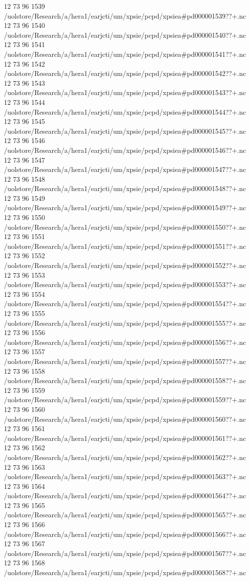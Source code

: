 12 73 96
1539
/uolstore/Research/a/hera1/earjcti/um/xpsie/pcpd/xpsiea#pd000001539??+.nc
12 73 96
1540
/uolstore/Research/a/hera1/earjcti/um/xpsie/pcpd/xpsiea#pd000001540??+.nc
12 73 96
1541
/uolstore/Research/a/hera1/earjcti/um/xpsie/pcpd/xpsiea#pd000001541??+.nc
12 73 96
1542
/uolstore/Research/a/hera1/earjcti/um/xpsie/pcpd/xpsiea#pd000001542??+.nc
12 73 96
1543
/uolstore/Research/a/hera1/earjcti/um/xpsie/pcpd/xpsiea#pd000001543??+.nc
12 73 96
1544
/uolstore/Research/a/hera1/earjcti/um/xpsie/pcpd/xpsiea#pd000001544??+.nc
12 73 96
1545
/uolstore/Research/a/hera1/earjcti/um/xpsie/pcpd/xpsiea#pd000001545??+.nc
12 73 96
1546
/uolstore/Research/a/hera1/earjcti/um/xpsie/pcpd/xpsiea#pd000001546??+.nc
12 73 96
1547
/uolstore/Research/a/hera1/earjcti/um/xpsie/pcpd/xpsiea#pd000001547??+.nc
12 73 96
1548
/uolstore/Research/a/hera1/earjcti/um/xpsie/pcpd/xpsiea#pd000001548??+.nc
12 73 96
1549
/uolstore/Research/a/hera1/earjcti/um/xpsie/pcpd/xpsiea#pd000001549??+.nc
12 73 96
1550
/uolstore/Research/a/hera1/earjcti/um/xpsie/pcpd/xpsiea#pd000001550??+.nc
12 73 96
1551
/uolstore/Research/a/hera1/earjcti/um/xpsie/pcpd/xpsiea#pd000001551??+.nc
12 73 96
1552
/uolstore/Research/a/hera1/earjcti/um/xpsie/pcpd/xpsiea#pd000001552??+.nc
12 73 96
1553
/uolstore/Research/a/hera1/earjcti/um/xpsie/pcpd/xpsiea#pd000001553??+.nc
12 73 96
1554
/uolstore/Research/a/hera1/earjcti/um/xpsie/pcpd/xpsiea#pd000001554??+.nc
12 73 96
1555
/uolstore/Research/a/hera1/earjcti/um/xpsie/pcpd/xpsiea#pd000001555??+.nc
12 73 96
1556
/uolstore/Research/a/hera1/earjcti/um/xpsie/pcpd/xpsiea#pd000001556??+.nc
12 73 96
1557
/uolstore/Research/a/hera1/earjcti/um/xpsie/pcpd/xpsiea#pd000001557??+.nc
12 73 96
1558
/uolstore/Research/a/hera1/earjcti/um/xpsie/pcpd/xpsiea#pd000001558??+.nc
12 73 96
1559
/uolstore/Research/a/hera1/earjcti/um/xpsie/pcpd/xpsiea#pd000001559??+.nc
12 73 96
1560
/uolstore/Research/a/hera1/earjcti/um/xpsie/pcpd/xpsiea#pd000001560??+.nc
12 73 96
1561
/uolstore/Research/a/hera1/earjcti/um/xpsie/pcpd/xpsiea#pd000001561??+.nc
12 73 96
1562
/uolstore/Research/a/hera1/earjcti/um/xpsie/pcpd/xpsiea#pd000001562??+.nc
12 73 96
1563
/uolstore/Research/a/hera1/earjcti/um/xpsie/pcpd/xpsiea#pd000001563??+.nc
12 73 96
1564
/uolstore/Research/a/hera1/earjcti/um/xpsie/pcpd/xpsiea#pd000001564??+.nc
12 73 96
1565
/uolstore/Research/a/hera1/earjcti/um/xpsie/pcpd/xpsiea#pd000001565??+.nc
12 73 96
1566
/uolstore/Research/a/hera1/earjcti/um/xpsie/pcpd/xpsiea#pd000001566??+.nc
12 73 96
1567
/uolstore/Research/a/hera1/earjcti/um/xpsie/pcpd/xpsiea#pd000001567??+.nc
12 73 96
1568
/uolstore/Research/a/hera1/earjcti/um/xpsie/pcpd/xpsiea#pd000001568??+.nc
